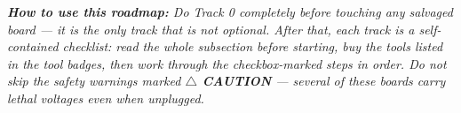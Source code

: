 \vspace{0.5cm}
\noindent
\begin{tcolorbox}[
  enhanced, colback=bgsubtle, colframe=arlizblue!30,
  leftrule=4pt, sharp corners, left=10pt, right=10pt, top=6pt, bottom=6pt
]
{\small\color{arligray}\itshape
\textbf{\color{arliznavy}How to use this roadmap:}
Do Track 0 completely before touching any salvaged board --- it is the only track that
is not optional. After that, each track is a self-contained checklist: read the whole
subsection before starting, buy the tools listed in the tool badges, then work through
the checkbox-marked steps in order. Do not skip the safety warnings marked
\textbf{\color{arlizgold}$\bigtriangleup$ CAUTION} --- several of these boards carry
lethal voltages even when unplugged.
}
\end{tcolorbox}
